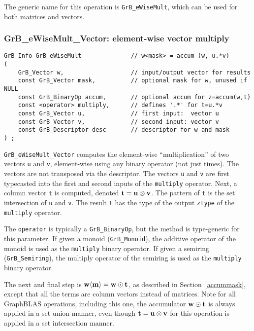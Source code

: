 \documentclass[12pt]{article}
\begin{document}
The generic name for this operation is \verb'GrB_eWiseMult', which can be used
for both matrices and vectors.

\newpage
\subsubsection{{\sf GrB\_eWiseMult\_Vector:} element-wise vector multiply}
\label{eWiseMult_vector}

\begin{mdframed}[userdefinedwidth=6in]
{\footnotesize
\begin{verbatim}
GrB_Info GrB_eWiseMult              // w<mask> = accum (w, u.*v)
(
    GrB_Vector w,                   // input/output vector for results
    const GrB_Vector mask,          // optional mask for w, unused if NULL
    const GrB_BinaryOp accum,       // optional accum for z=accum(w,t)
    const <operator> multiply,      // defines '.*' for t=u.*v
    const GrB_Vector u,             // first input:  vector u
    const GrB_Vector v,             // second input: vector v
    const GrB_Descriptor desc       // descriptor for w and mask
) ;
\end{verbatim}
} \end{mdframed}

\verb'GrB_eWiseMult_Vector' computes the element-wise ``multiplication'' of two
vectors \verb'u' and \verb'v', element-wise using any binary operator (not just
times).  The vectors are not transposed via the descriptor.  The vectors
\verb'u' and \verb'v' are first typecasted into the first and second inputs of
the \verb'multiply' operator.  Next, a column vector \verb't' is computed,
denoted ${\bf t = u \otimes v}$.  The pattern of \verb't' is the set
intersection of \verb'u' and \verb'v'.  The result \verb't' has the type of the
output \verb'ztype' of the \verb'multiply' operator.

The \verb'operator' is typically a \verb'GrB_BinaryOp', but the method is
type-generic for this parameter.  If given a monoid (\verb'GrB_Monoid'), the
additive operator of the monoid is used as the \verb'multiply' binary operator.
If given a semiring (\verb'GrB_Semiring'), the multiply operator of the
semiring is used as the \verb'multiply' binary operator.

The next and final step is ${\bf w \langle m \rangle  = w \odot t}$, as
described in Section~\ref{accummask}, except that all the terms are column
vectors instead of matrices.  Note for all GraphBLAS operations, including this
one, the accumulator ${\bf w \odot t}$ is always applied in a set union manner,
even though ${\bf t = u \otimes v}$ for this operation is applied in a set
intersection manner.
\end{document}

